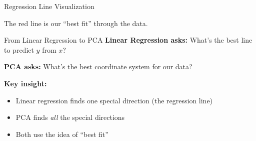 \documentclass[aspectratio=169]{beamer}
\begin{document}
\begin{frame}{Regression Line Visualization}
\begin{center}
\end{center}

The red line is our ``best fit'' through the data.
\end{frame}

\begin{frame}{From Linear Regression to PCA}
\textbf{Linear Regression asks:} What's the best line to predict $y$ from $x$?

\vspace{1em}
\textbf{PCA asks:} What's the best coordinate system for our data?

\vspace{2em}
\textbf{Key insight:}
\begin{itemize}
    \item Linear regression finds one special direction (the regression line)
    \item PCA finds \emph{all} the special directions
    \item Both use the idea of ``best fit''
\end{itemize}
\end{frame}
\end{document}
